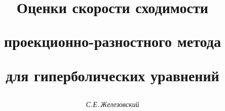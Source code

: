 






\newcommand{\tts}[1]{}




\renewcommand{\baselinestretch}{1.03}







\setcounter{page}{21}















\author{\it С.Е.\,Железовский}




\title{Оценки скорости сходимости


проекционно-разностного метода


для гиперболических уравнений}





\date{}




\pagestyle{plain} %







\maketitle


\label{begin}









